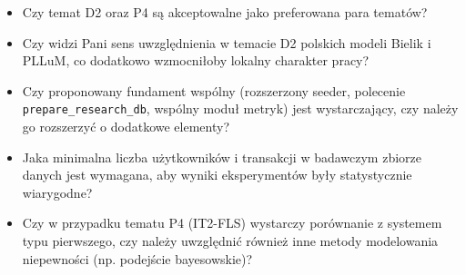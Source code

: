 \documentclass[12pt,a4paper]{article}
\begin{document}
\begin{itemize}
\item Czy temat D2 oraz P4 są akceptowalne jako preferowana para tematów?
\item Czy widzi Pani sens uwzględnienia w temacie D2 polskich modeli Bielik i PLLuM, co dodatkowo wzmocniłoby lokalny charakter pracy?
\item Czy proponowany fundament wspólny (rozszerzony seeder, polecenie \texttt{prepare\_research\_db}, wspólny moduł metryk) jest wystarczający, czy należy go rozszerzyć o dodatkowe elementy?
\item Jaka minimalna liczba użytkowników i transakcji w badawczym zbiorze danych jest wymagana, aby wyniki eksperymentów były statystycznie wiarygodne?
\item Czy w przypadku tematu P4 (IT2-FLS) wystarczy porównanie z systemem typu pierwszego, czy należy uwzględnić również inne metody modelowania niepewności (np. podejście bayesowskie)?
\end{itemize}
\end{document}
